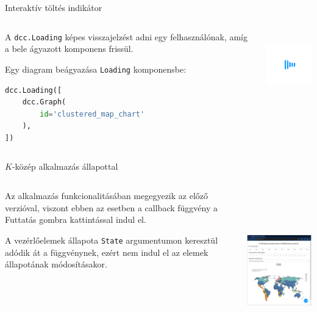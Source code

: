 \documentclass[english, aspectratio=169]{beamer}
\begin{document}
	\begin{frame}[fragile]{Interaktív töltés indikátor}
		\begin{columns}
			\begin{column}{.5\textwidth}
				A \texttt{dcc.Loading} képes visszajelzést adni egy felhasználónak, amíg a bele ágyazott komponens frissül.\par\smallskip
				Egy diagram beágyazása \texttt{Loading} komponensbe:
				\begin{lstlisting}[language=python]
dcc.Loading([
	dcc.Graph(
		id='clustered_map_chart'
	),
])
				\end{lstlisting}
			\end{column}
			\begin{column}{.5\textwidth}
				\begin{center}
					\includegraphics[width=3cm, height=3cm, keepaspectratio]{images/freq_21.png}
				\end{center}
			\end{column}
		\end{columns}
	\end{frame}
	
	
	\begin{frame}[fragile]{$K$-közép alkalmazás állapottal}
		\begin{columns}
			\begin{column}{.5\textwidth}
				Az alkalmazás funkcionalitásában megegyezik az előző verzióval, viszont ebben az esetben a callback függvény a Futtatás gombra kattintással indul el.\par\smallskip
				A vezérlőelemek állapota \texttt{State} argumentumon keresztül adódik át a függvénynek, ezért nem indul el az elemek állapotának módosításakor. 
			\end{column}
			\begin{column}{.5\textwidth}
				\begin{center}
					\includegraphics[width=7cm, height=7cm, keepaspectratio]{images/freq_22.png}
				\end{center}
			\end{column}
		\end{columns}
	\end{frame}
	
\end{document}
